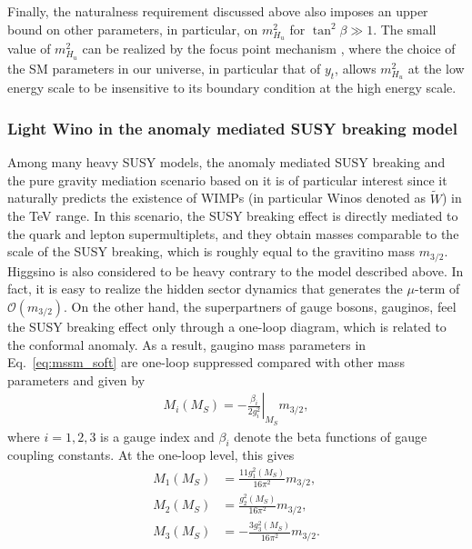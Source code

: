 \documentclass[12pt,twoside,book]{article}
\begin{document}
Finally, the naturalness requirement discussed above also imposes an upper bound on other parameters, in particular, on $m_{H_u}^2$ for $\tan^2 \beta \gg 1$.
The small value of $m_{H_u}^2$ can be realized by the focus point mechanism \cite{Feng:1999hg, Feng:1999mn, Feng:1999zg}, where the choice of the SM parameters in our universe, in particular that of $y_t$, allows $m_{H_u}^2$ at the low energy scale to be insensitive to its boundary condition at the high energy scale.


\subsubsection*{Light Wino in the anomaly mediated SUSY breaking model}

Among many heavy SUSY models, the anomaly mediated SUSY breaking \cite{Giudice:1998xp, Randall:1998uk} and the pure gravity mediation scenario based on it \cite{Ibe:2006de, Ibe:2011aa, ArkaniHamed:2012gw} is of particular interest since it naturally predicts the existence of WIMPs (in particular Winos denoted as $\tilde{W}$) in the TeV range.
In this scenario, the SUSY breaking effect is directly mediated to the quark and lepton supermultiplets, and they obtain masses comparable to the scale of the SUSY breaking, which is roughly equal to the gravitino mass $m_{3/2}$.
Higgsino is also considered to be heavy contrary to the model described above.
In fact, it is easy to realize the hidden sector dynamics that generates the $\mu$-term of $\mathcal{O} (m_{3/2})$.
On the other hand, the superpartners of gauge bosons, gauginos, feel the SUSY breaking effect only through a one-loop diagram, which is related to the conformal anomaly.
As a result, gaugino mass parameters in Eq.~\eqref{eq:mssm_soft} are one-loop suppressed compared with other mass parameters and given by
\begin{align}
  M_i (M_S) = -\left. \frac{\beta_i}{2 g_i^2} \right|_{M_S} m_{3/2},
\end{align}
where $i=1,2,3$ is a gauge index and $\beta_i$ denote the beta functions of gauge coupling constants.
At the one-loop level, this gives
\begin{align}
  M_1 (M_S) &= \frac{11 g_1^2 (M_S)}{16 \pi^2} m_{3/2},\\
  M_2 (M_S) &= \frac{g_2^2 (M_S)}{16 \pi^2} m_{3/2},\\
  M_3 (M_S) &= -\frac{3 g_3^2 (M_S)}{16 \pi^2} m_{3/2}.
\end{align}
\end{document}
